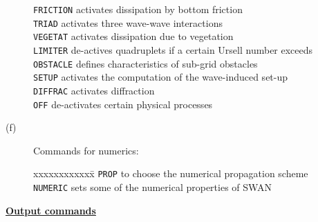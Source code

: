 \documentclass[12pt]{book}
\begin{document}
\begin{description}
\begin{tabbing}
{\tt FRICTION} \> activates dissipation by bottom friction\\
{\tt TRIAD}    \> activates three wave-wave interactions\\
{\tt VEGETAT}  \> activates dissipation due to vegetation\\
{\tt LIMITER}  \> de-actives quadruplets if a certain Ursell number exceeds\\
{\tt OBSTACLE} \> defines characteristics of sub-grid obstacles\\
{\tt SETUP}    \> activates the computation of the wave-induced set-up\\
{\tt DIFFRAC}  \> activates diffraction\\
{\tt OFF}      \> de-activates certain physical processes\\
\end{tabbing}
  \item[(f)] Commands for numerics:
\begin{tabbing}
xxxxxxxxxxxx\= \kill
{\tt PROP}    \> to choose the numerical propagation scheme\\
{\tt NUMERIC} \> sets some of the numerical properties of SWAN\\
\end{tabbing}
\end{description}
\underline{\bf Output commands}
\end{document}
